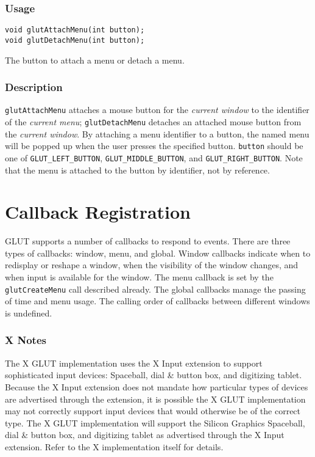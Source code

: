 \subsubsection*{Usage}
\begin{verbatim}
void glutAttachMenu(int button);
void glutDetachMenu(int button);
\end{verbatim}
\begin{description}
\itemsep 0in
\item[\tt button]
The button to attach a menu or detach a menu.
\end{description}

\subsubsection*{Description}

{\tt glutAttachMenu} attaches a mouse button for the {\em current window} to the identifier of
the {\em current menu}; {\tt glutDetachMenu} detaches an attached mouse button from the
{\em current window}.  By attaching a menu identifier to a button, the named menu
will be popped up when the user presses the specified button.
{\tt button} should be one of {\tt GLUT\_LEFT\_BUTTON}, {\tt GLUT\_MIDDLE\_BUTTON},
and {\tt GLUT\_RIGHT\_BUTTON}.  Note that the menu is attached to the button by
identifier, not by reference.

\section{Callback Registration}

GLUT supports a number of callbacks to respond to events.  There are
three types of callbacks:  window, menu, and global.   Window callbacks
indicate when to redisplay or reshape a window, when the visibility of
the window changes, and when input is available for the window.
The menu callback is set by the {\tt glutCreateMenu} call described already.
The global callbacks manage the passing of time and menu usage.
The calling order of callbacks between different windows is undefined.

\subsubsection*{X Notes}

The X GLUT implementation uses the X Input extension \cite{xinput-lib,xinput-protocol}
to support sophisticated input devices:  Spaceball, dial \& button box,
and digitizing tablet.  Because the X Input extension does not
mandate how particular types of devices are advertised through
the extension, it is possible the X GLUT implementation may not
correctly support input devices that would otherwise be of the
correct type.  The X GLUT implementation will support the Silicon
Graphics Spaceball, dial \& button box, and digitizing tablet as
advertised through the X Input extension.
Refer to the X implementation itself for details.

